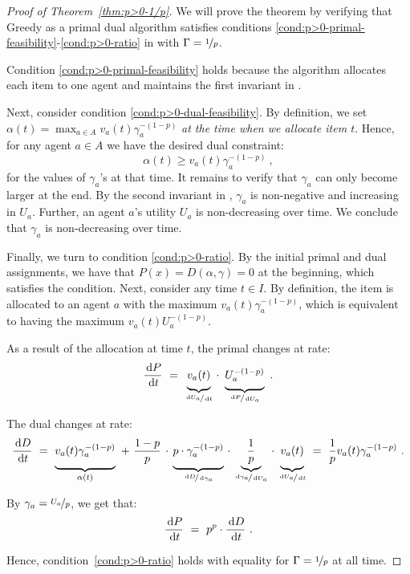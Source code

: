 \documentclass[11pt,letterpaper]{article}
\newcommand{\dif}[1]{\,\text{\rm d} #1}
\newcommand{\utility}{U}
\begin{document}
\begin{proof}[Proof of Theorem~\ref{thm:p>0-1/p}]
	We will prove the theorem by verifying that Greedy as a primal dual algorithm satisfies conditions \ref{cond:p>0-primal-feasibility}-\ref{cond:p>0-ratio} in  with $\Gamma= \nicefrac{1}{p}$.
	
	Condition \ref{cond:p>0-primal-feasibility} holds because the algorithm allocates each item to one agent and maintains the first invariant in .
	
	Next, consider condition \ref{cond:p>0-dual-feasibility}. 
	By definition, we set $\alpha(t) = \max_{a \in A} v_a(t) \gamma_a^{-(1-p)}$ \emph{at the time when we allocate item $t$}.
	Hence, for any agent $a \in A$ we have the desired dual constraint:
	\[
		\alpha(t) \geq v_a(t)\gamma_a^{-(1-p)}
		~,
	\]
	for the values of $\gamma_a$'s at that time.
	It remains to verify that $\gamma_a$ can only become larger at the end.
	By the second invariant in , $\gamma_a$ is non-negative and increasing in $\utility_a$.
	Further, an agent $a$'s utility $\utility_a$ is non-decreasing over time.
	We conclude that $\gamma_a$ is non-decreasing over time.
		
	Finally, we turn to condition \ref{cond:p>0-ratio}. 
	By the initial primal and dual assignments, we have that $P(x) = D(\alpha, \gamma) = 0$ at the beginning, which satisfies the condition.
	Next, consider any time $t \in I$.
	By definition, the item is allocated to an agent $a$ with the maximum $v_a(t) \gamma_a^{-(1-p)}$, which is equivalent to having the maximum $v_a(t) \utility_a^{-(1-p)}$.
	
	As a result of the allocation at time $t$, the primal changes at rate:
	\begin{equation*}
		\frac{\dif{P}}{\dif{t}} ~=~ \underbrace{\vphantom{\Big|} v_a(t)}_{\nicefrac{\dif{\utility_a}}{\dif{t}}} \,\cdot~ \underbrace{\vphantom{\Big|} \utility_a^{-(1-p)}}_{\nicefrac{\dif{P}}{\dif{\utility_a}}}
		~.
	\end{equation*}
	
	
	The dual changes at rate:
	\[
		\frac{\dif{D}}{\dif{t}}
		~=~ 
		\underbrace{\vphantom{\bigg|} v_a(t) \gamma_a^{-(1-p)}}_{\alpha(t)} 
		~+~ 
		\frac{1-p}{p} 
		\,\cdot\, 
		\underbrace{\vphantom{\bigg|} p \cdot \gamma_a^{-(1-p)}}_{\nicefrac{\dif{D}}{\dif{\gamma_a}}} 
		\,\cdot\,
		\underbrace{\vphantom{\bigg|} \frac{1}{p}}_{\nicefrac{\dif{\gamma_a}}{\dif{\utility_a}}} 
		\,\cdot\,
		\underbrace{\vphantom{\bigg|} v_a(t)}_{\nicefrac{\dif{\utility_a}}{\dif{t}}}
		~=~
		\frac{1}{p} v_a(t) \gamma_a^{-(1-p)}
		~.		
	\]
	
	By $\gamma_a = \nicefrac{\utility_a}{p}$, we get that:
	\[
		\frac{\dif{P}}{\dif{t}} ~=~ p^p \cdot \frac{\dif{D}}{\dif{t}}
		~.
	\]
	
	Hence, condition~\ref{cond:p>0-ratio} holds with equality for $\Gamma = \nicefrac{1}{p}$ at all time.
\end{proof}
\end{document}
